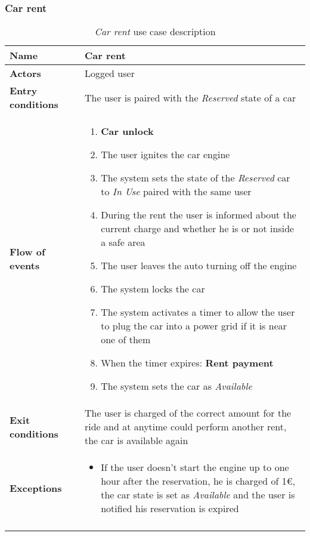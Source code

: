\subsubsection{Car rent}
\begin{longtable}{p{0.25\linewidth}p{0.75\linewidth}}
\toprule
\textbf{Name} & \textbf{Car rent} \\
\midrule
\textbf{Actors} &  Logged user \\
\midrule
\textbf{Entry conditions} & 
The user is paired with the \emph{Reserved} state of a car\\
\midrule
\textbf{Flow of events} & 
\begin{enumerate}
	\item \textbf{Car unlock}
	\item The user ignites the car engine
	\item The system sets the state of the \emph{Reserved} car to \emph{In Use} paired
	with the same user
	\item During the rent the user is informed about the current charge and whether he is or not inside a safe area
	\item The user leaves the auto turning off the engine
	\item The system locks the car
    \item The system activates a timer to allow the user to plug the car into a power grid if it is
    near one of them
	\item When the timer expires: \textbf{Rent payment}
	\item The system sets the car as \emph{Available}
\end{enumerate} \\
\midrule
\textbf{Exit conditions} & 
The user is charged of the correct amount for the ride and at anytime could perform another rent, the car is available again\\
\midrule
\textbf{Exceptions} & 
\begin{itemize}
	\item If the user doesn't start the engine up to one hour after the reservation, he is charged of 1\euro , the car state is set as \emph{Available} and the user is notified his reservation is expired
\end{itemize} \\
\bottomrule
\caption{\emph{Car rent} use case description}
\end{longtable}

\clearpage
